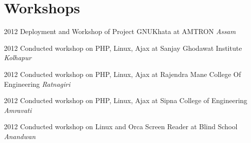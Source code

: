 \documentclass[]{friggeri-cv}
\begin{document}
\section{Workshops}
\begin{entrylist}
  \entry
    {2012}
    {Deployment and Workshop of Project GNUKhata at AMTRON}
    {}
    {\emph{Assam}}
    \end{entrylist}
    \begin{entrylist}
     \entry
      {2012}
    {Conducted workshop on PHP, Linux, Ajax at Sanjay Ghodawat Institute}
    {}
    {\emph{Kolhapur}}
\end{entrylist}
 \begin{entrylist}
     \entry
      {2012}
    {Conducted workshop on PHP, Linux, Ajax at Rajendra Mane College Of Engineering}
    {}
    {\emph{Ratnagiri}}
\end{entrylist}
\begin{entrylist}
     \entry
      {2012}
    {Conducted workshop on PHP, Linux, Ajax at Sipna College of Engineering}
    {}
    {\emph{Amravati}}
\end{entrylist}
\begin{entrylist}
     \entry
      {2012}
    {Conducted workshop on Linux and Orca Screen Reader at Blind School}
    {}
    {\emph{Anandwan}}
\end{entrylist}
\end{document}
